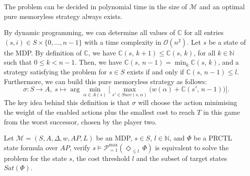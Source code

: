\begin{theorem} The \SPG{} problem can be decided in polynomial time in the size of $\mathcal{M}$ and %
an optimal pure memoryless strategy always exists.%
\end{theorem}

By dynamic programming, we can determine all values of $\mathbb{C}$ for all entries $(s, i) \in S \times \{0, \dots, n-1\}$ with a time complexity in $\mathcal{O}(n^2)$.
Let $s$ be a state of the MDP. By definition of $\mathbb{C}$, we have $\mathbb{C}(s,\, k + 1) \leq \mathbb{C}(s,\, k)$, for all $k \in \mathbb{N}$ such that $0 \leq k < n-1$.
Then, we have $\mathbb{C}(s, \, n-1) = \min_{k} \mathbb{C}(s, \, k)$, and
a strategy satisfying the \SPG{} problem for $s \in S$ exists if and only if $\mathbb{C}(s,\, n-1) \leq l$.
Furthermore, we can build this pure memoryless strategy as follows:
\[
  \sigma : S \rightarrow A, \; s \mapsto \arg \min_{\alpha \in A(s)} \big[ \max_{s' \in Succ(s, \alpha)} \big(w(\alpha) + \mathbb{C}(s',\, n - 1) \big) \big].
\]
The key idea behind this definition is that $\sigma$ will choose the action minimising the weight of the enabled actions plus the smallest cost to reach $T$ in this game from the worst successor, chosen by the player two.

\begin{remark}
  Let $\mathcal{M}=(S, A, \Delta, w, AP, L)$ be an MDP, $s \in S$, $l \in \mathbb{N}$, and $\Phi$ be a PRCTL state formula over $AP$,
  verify $s \models \mathcal{P}^{\max}_{=1}(\Diamond_{\leq l}\, \Phi)$ is equivalent to solve the \SPG{} problem for the state $s$, the cost threshold $l$ and the subset of target states $Sat(\Phi)$.
\end{remark}


